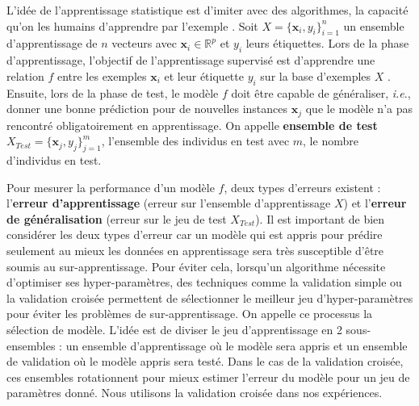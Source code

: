 
L'idée de l'apprentissage statistique est d'imiter avec des algorithmes, la capacité qu'on les humains d'apprendre par l'exemple \cite{Dreyfus2006}. Soit $X=\{\textbf{x}_i,y_i\}_{i=1}^n$ un ensemble d'apprentissage de $n$ vecteurs avec $\textbf{x}_i \in \mathbb{R}^p$ et $y_i$ leurs étiquettes. Lors de la phase d'apprentissage, l'objectif de l'apprentissage supervisé est d'apprendre une relation $f$ entre les exemples $\textbf{x}_i$ et leur étiquette $y_i$ sur la base d'exemples $X$ \cite{Bishop2006,Duda1973}. Ensuite, lors de la phase de test, le modèle $f$ doit être capable de généraliser, \textit{i.e}., donner une bonne prédiction pour de nouvelles instances $\textbf{x}_j$ que le modèle n'a pas rencontré obligatoirement en apprentissage. On appelle \textbf{ensemble de test} $X_{Test}=\{\textbf{x}_j,y_j\}_{j=1}^m$, l'ensemble des individus en test avec $m$, le nombre d'individus en test.

Pour mesurer la performance d'un modèle $f$, deux types d'erreurs existent : l'\textbf{erreur d'apprentissage} (erreur sur l'ensemble d'apprentissage $X$) et l'\textbf{erreur de généralisation} (erreur sur le jeu de test $X_{Test}$). Il est important de bien considérer les deux types d'erreur car un modèle qui est appris pour prédire seulement au mieux les données en apprentissage sera très susceptible d'être soumis au sur-apprentissage. Pour éviter cela, lorsqu'un algorithme nécessite d'optimiser ses hyper-paramètres, des techniques comme la validation simple ou la validation croisée permettent de sélectionner le meilleur jeu d'hyper-paramètres pour éviter les problèmes de sur-apprentissage. On appelle ce processus la sélection de modèle. L'idée est de diviser le jeu d'apprentissage en 2 sous-ensembles : un ensemble d'apprentissage où le modèle sera appris et un ensemble de validation où le modèle appris sera testé. Dans le cas de la validation croisée, ces ensembles rotationnent pour mieux estimer l'erreur du modèle pour un jeu de paramètres donné. Nous utilisons la validation croisée dans nos expériences.


